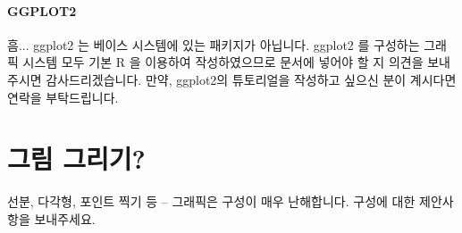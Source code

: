 


\paragraph{GGPLOT2}
흠...  ggplot2 는 베이스 시스템에 있는 패키지가 아닙니다. 
ggplot2 를 구성하는 그래픽 시스템 모두 기본 R 을 이용하여 작성하였으므로 문서에 넣어야 할 지 의견을 보내주시면 감사드리겠습니다.
만약, ggplot2의 튜토리얼을 작성하고 싶으신 분이 계시다면 연락을 부탁드립니다. 



\section{그림 그리기?}

선분, 다각형, 포인트 찍기 등 -- 그래픽은 구성이 매우 난해합니다. 
구성에 대한 제안사항을 보내주세요.
